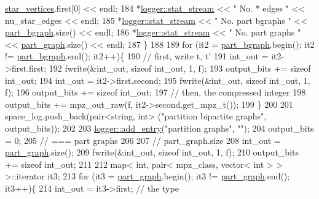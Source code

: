 \begin{DoxyCode}
      \hyperlink{classmarked__graph__compressed_a7a4ced4586e2e353f9076bd447df5208}{star\_vertices}.first[0] << endl;
184     *\hyperlink{classlogger_a7db37821f875f2ba3540980b355779f5}{logger::stat\_stream} << \textcolor{stringliteral}{" No. * edges       "} << nu\_star\_edges << endl;
185     *\hyperlink{classlogger_a7db37821f875f2ba3540980b355779f5}{logger::stat\_stream} << \textcolor{stringliteral}{" No. part bgraphs  "} << 
      \hyperlink{classmarked__graph__compressed_a7b3267063fba30b45eb21b3ba4e07536}{part\_bgraph}.size() << endl;
186     *\hyperlink{classlogger_a7db37821f875f2ba3540980b355779f5}{logger::stat\_stream} << \textcolor{stringliteral}{" No. part graphs   "} << 
      \hyperlink{classmarked__graph__compressed_ae179a4737e6eab905c18a94d44ef64b7}{part\_graph}.size() << endl;
187   \}
188 
189   \textcolor{keywordflow}{for} (it2 = \hyperlink{classmarked__graph__compressed_a7b3267063fba30b45eb21b3ba4e07536}{part\_bgraph}.begin(); it2 != \hyperlink{classmarked__graph__compressed_a7b3267063fba30b45eb21b3ba4e07536}{part\_bgraph}.end(); it2++)\{
190     \textcolor{comment}{// first, write t, t'}
191     int\_out = it2->first.first;
192     fwrite(&int\_out, \textcolor{keyword}{sizeof} int\_out, 1, f);
193     output\_bits += \textcolor{keyword}{sizeof} int\_out;
194     int\_out = it2->first.second;
195     fwrite(&int\_out, \textcolor{keyword}{sizeof} int\_out, 1, f);
196     output\_bits += \textcolor{keyword}{sizeof} int\_out;
197     \textcolor{comment}{// then, the compressed integer}
198     output\_bits += mpz\_out\_raw(f, it2->second.get\_mpz\_t());
199   \}
200 
201   space\_log.push\_back(pair<string, int> (\textcolor{stringliteral}{"partition bipartite graphs"}, output\_bits));
202 
203   \hyperlink{classlogger_a710163deb17bc81f70d53d285b8ac9ac}{logger::add\_entry}(\textcolor{stringliteral}{"partition graphs"}, \textcolor{stringliteral}{""});
204   output\_bits = 0;
205   \textcolor{comment}{// === part graphs}
206 
207   \textcolor{comment}{// part\_graph.size}
208   int\_out = \hyperlink{classmarked__graph__compressed_ae179a4737e6eab905c18a94d44ef64b7}{part\_graph}.size();
209   fwrite(&int\_out, \textcolor{keyword}{sizeof} int\_out, 1, f);
210   output\_bits += \textcolor{keyword}{sizeof} int\_out;
211 
212   map< int, pair< mpz\_class, vector< int > > >::iterator it3;
213   \textcolor{keywordflow}{for} (it3 = \hyperlink{classmarked__graph__compressed_ae179a4737e6eab905c18a94d44ef64b7}{part\_graph}.begin(); it3 != \hyperlink{classmarked__graph__compressed_ae179a4737e6eab905c18a94d44ef64b7}{part\_graph}.end(); it3++)\{
214     int\_out = it3->first; \textcolor{comment}{// the type}

\end{DoxyCode}
